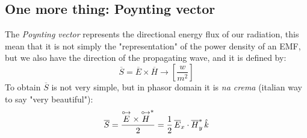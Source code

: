 \subsection*{One more thing: Poynting vector}
The \emph{Poynting vector} represents the directional energy flux of our radiation, this mean that it is not simply the "representation" of the power density of an EMF, but we also have the direction of the propagating wave, and it is defined by:
\begin{equation}\label{eq:poynting}
    \overline{S}=\overline{E}\times\overline{H}\rightarrow\left[\frac{w}{m^2}\right]
\end{equation}
To obtain $\overline{S}$ is not very simple, but in phasor domain it is \emph{na crema} (italian way to say "very beautiful"):
\begin{equation}
    \overline{S}=\frac{\overset{\mathbin {{\circ \mkern-2.5mu\rightarrow}}}{E}\times\overset{\mathbin {{\circ \mkern-2.5mu\rightarrow}}}{H}^*}{2}=\frac{1}{2}\,\overline{E}
_x\cdot\overline{H}_y^*\,\hat{\mathnormal{k}}
\end{equation}